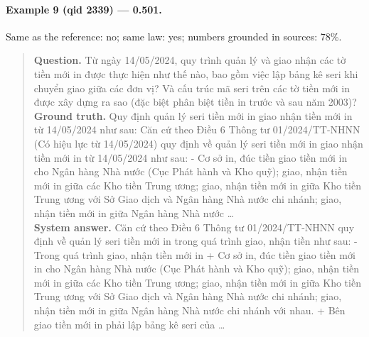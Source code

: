 \paragraph{Example 9 (qid 2339) --- \rl{} 0.501.} Same \dieu{} as the reference: no; same law: yes; numbers grounded in sources: 78\%.
\begin{quote}\small\textbf{Question.} Từ ngày 14/05/2024, quy trình quản lý và giao nhận các tờ tiền mới in được thực hiện như thế nào, bao gồm việc lập bảng kê seri khi chuyển giao giữa các đơn vị? Và cấu trúc mã seri trên các tờ tiền mới in được xây dựng ra sao (đặc biệt phân biệt tiền in trước và sau năm 2003)?\\[2pt]
\textbf{Ground truth.} Quy định quản lý seri tiền mới in giao nhận tiền mới in từ 14/05/2024 như sau: Căn cứ theo Điều 6 Thông tư 01/2024/TT-NHNN (Có hiệu lực từ 14/05/2024) quy định về quản lý seri tiền mới in giao nhận tiền mới in từ 14/05/2024 như sau: - Cơ sở in, đúc tiền giao tiền mới in cho Ngân hàng Nhà nước (Cục Phát hành và Kho quỹ); giao, nhận tiền mới in giữa các Kho tiền Trung ương; giao, nhận tiền mới in giữa Kho tiền Trung ương với Sở Giao dịch và Ngân hàng Nhà nước chi nhánh; giao, nhận tiền mới in giữa Ngân hàng Nhà nước …\\[2pt]
\textbf{System answer.} Căn cứ theo Điều 6 Thông tư 01/2024/TT-NHNN quy định về quản lý seri tiền mới in trong quá trình giao, nhận tiền như sau: - Trong quá trình giao, nhận tiền mới in + Cơ sở in, đúc tiền giao tiền mới in cho Ngân hàng Nhà nước (Cục Phát hành và Kho quỹ); giao, nhận tiền mới in giữa các Kho tiền Trung ương; giao, nhận tiền mới in giữa Kho tiền Trung ương với Sở Giao dịch và Ngân hàng Nhà nước chi nhánh; giao, nhận tiền mới in giữa Ngân hàng Nhà nước chi nhánh với nhau. + Bên giao tiền mới in phải lập bảng kê seri của …\end{quote}

